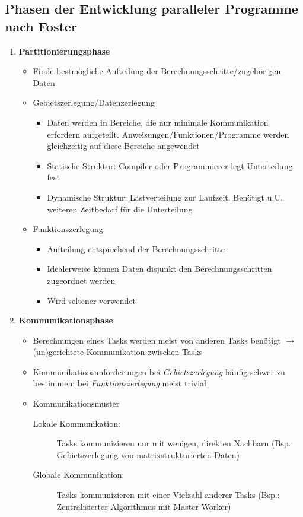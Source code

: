 \subsection{Phasen der Entwicklung paralleler Programme nach Foster}
\begin{enumerate}
	\item \textbf{Partitionierungsphase}
	\begin{itemize}
		\item Finde bestmögliche Aufteilung der Berechnungsschritte/zugehörigen Daten
		\item Gebietszerlegung/Datenzerlegung
		\begin{itemize}
			\item Daten werden in Bereiche, die nur minimale Kommunikation erfordern aufgeteilt. Anweisungen/Funktionen/Programme werden gleichzeitig auf diese Bereiche angewendet
			\item Statische Struktur: Compiler oder Programmierer legt Unterteilung fest
			\item Dynamische Struktur: Lastverteilung zur Laufzeit. Benötigt u.U. weiteren Zeitbedarf für die Unterteilung
		\end{itemize}
		\item Funktionszerlegung
		\begin{itemize}
			\item Aufteilung entsprechend der Berechnungsschritte
			\item Idealerweise können Daten disjunkt den Berechnungsschritten zugeordnet werden
			\item Wird seltener verwendet
		\end{itemize}
	\end{itemize}
	\item \textbf{Kommunikationsphase}
	\begin{itemize}
		\item Berechnungen eines Tasks werden meist von anderen Tasks benötigt \(\rightarrow\) (un)gerichtete Kommunikation zwischen Tasks
		\item Kommunikationsanforderungen bei \textit{Gebietszerlegung} häufig schwer zu bestimmen; bei \textit{Funktionszerlegung} meist trivial
		\item Kommunikationsmuster
		\begin{description}
			\item[Lokale Kommunikation:] Tasks kommunizieren nur mit wenigen, direkten Nachbarn (Bsp.: Gebietszerlegung von matrixstrukturierten Daten)
			\item[Globale Kommunikation:] Tasks kommunizieren mit einer Vielzahl anderer Tasks (Bsp.: Zentralisierter Algorithmus mit Master-Worker)

\end{description}
\end{itemize}
\end{enumerate}
